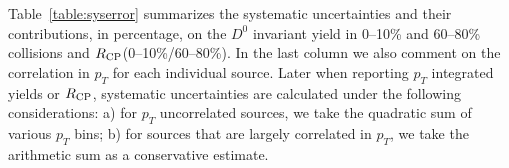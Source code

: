 \documentclass[%
 reprint,	
 amsmath,amssymb,
 aps,
 prc,
]{revtex4-1}
\begin{document}
\begin{table}
\label{table:syserror}
\end{table}


Table~\ref{table:syserror} summarizes the systematic uncertainties and their contributions, in percentage, on the $D^0$ invariant yield in 0--10\% and 60--80\% collisions and $R_{\rm CP}$(0--10\%/60--80\%). In the last column we also comment on the correlation in $p_{T}$ for each individual source. Later when reporting $p_{T}$ integrated yields or $R_{\rm CP}$, systematic uncertainties are calculated under the following considerations: a) for $p_{T}$ uncorrelated sources, we take the quadratic sum of various $p_{T}$ bins; b) for sources that are largely correlated in $p_{T}$, we take the arithmetic sum as a conservative estimate.
\end{document}

